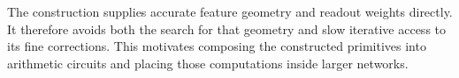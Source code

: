 The construction supplies accurate feature geometry and readout weights
directly. It therefore avoids both the search for that geometry and slow
iterative access to its fine corrections. This motivates composing the
constructed primitives into arithmetic circuits and placing those computations
inside larger networks.

